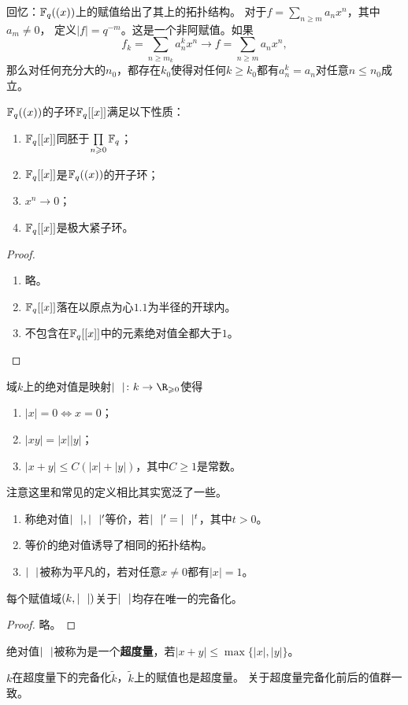 \begin{example}
    回忆：$\mathbb{F}_q((x))$上的赋值给出了其上的拓扑结构。
    对于$f = \sum\limits_{n \geqslant m} a_nx^n$，其中$a_m \neq 0$，
    定义$|f| = q^{-m}$。这是一个非阿赋值。如果
    \[f_k = \sum_{n \geqslant m_k} a_n^{k}x^n \to f = \sum_{n \geqslant m}a_nx^n,\]
    那么对任何充分大的$n_0$，都存在$k_0$使得对任何$k \geqslant k_0$都有$a_n^k = a_n$对任意$n \leqslant n_0$成立。
\end{example}
\begin{proposition}
    $\mathbb{F}_q((x))$的子环$\mathbb{F}_q[[x]]$满足以下性质：
    \begin{enumerate}
        \item $\mathbb{F}_q[[x]]$同胚于$\prod\limits_{n \geqslant 0} \mathbb{F}_q$；
        \item $\mathbb{F}_q[[x]]$是$\mathbb{F}_q((x))$的开子环；
        \item $x^n \to 0$；
        \item $\mathbb{F}_q[[x]]$是极大紧子环。
    \end{enumerate}
\end{proposition}
\begin{proof}
    \begin{enumerate}
        \item[1.3.]略。
        \item[2.]$\mathbb{F}_q[[x]]$落在以原点为心$1.1$为半径的开球内。
        \item[4.]不包含在$\mathbb{F}_q[[x]]$中的元素绝对值全都大于$1$。\qedhere
    \end{enumerate}
\end{proof}
\begin{definition}
    域$k$上的绝对值是映射$\as \colon k \to \R_{\geqslant 0}$使得
    \begin{enumerate}
        \item $|x| = 0 \iff x = 0$；
        \item $|xy| = |x||y|$；
        \item $|x+y| \leqslant C(|x|+|y|)$，其中$C\geqslant 1$是常数。
    \end{enumerate}
\end{definition}
注意这里和常见的定义相比其实宽泛了一些。
\begin{remark}
    \begin{enumerate}
        \item 称绝对值$|\ \ |,|\ \ |'$等价，若$|\ \ |' = |\ \ |^t$，其中$t > 0$。
        \item 等价的绝对值诱导了相同的拓扑结构。
        \item $|\ \ |$被称为平凡的，若对任意$x\neq 0$都有$|x| = 1$。
    \end{enumerate}
\end{remark}
\begin{theorem}
    每个赋值域$(k,|\ \ |)$关于$|\ \ |$均存在唯一的完备化。
\end{theorem}
\begin{proof}
    略。
\end{proof}
\begin{definition}
    绝对值$|\ \ |$被称为是一个\textbf{超度量}，若$|x+y| \leqslant \max\{|x|,|y|\}$。
\end{definition}
$k$在超度量下的完备化$\tilde{k}$，$\tilde{k}$上的赋值也是超度量。
关于超度量完备化前后的值群一致。

